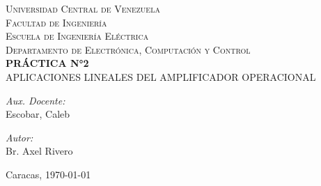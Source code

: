 
\begin{titlepage}
    \begin{center}
        \textsc{\large Universidad Central de Venezuela}\\
        \textsc{\large Facultad de Ingeniería}\\
        \textsc{\large Escuela de Ingeniería Eléctrica}\\
        \textsc{\large Departamento de Electrónica, Computación y Control}\\[7cm]
        
        {\huge \bfseries PRÁCTICA N°2}\\[0.2cm]
        {\Large APLICACIONES LINEALES DEL AMPLIFICADOR OPERACIONAL}\\[10cm]
        
        \begin{minipage}{0.4\textwidth}
            \begin{flushleft}
                \emph{Aux. Docente:}\\
                Escobar, Caleb 
            \end{flushleft}
        \end{minipage}
        \begin{minipage}{0.4\textwidth}
            \begin{flushright}
                \emph{Autor:}\\
                Br. Axel Rivero
            \end{flushright}
        \end{minipage}
        
        \vfill
        
        {\large Caracas, \today} %
        
    \end{center}
\end{titlepage}
